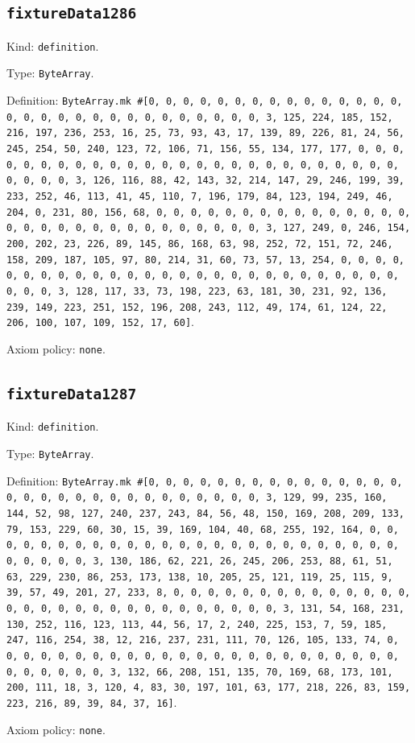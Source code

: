 \documentclass[11pt]{article}
\begin{document}
\subsection*{\texttt{fixtureData1286}}
\noindent Kind: \texttt{definition}.\par
\noindent Type: \texttt{ByteArray}.\par
\noindent Definition: \texttt{ByteArray.mk \#[0, 0, 0, 0, 0, 0, 0, 0, 0, 0, 0, 0, 0, 0, 0, 0, 0, 0, 0, 0, 0, 0, 0, 0, 0, 0, 0, 0, 0, 0, 3, 125, 224, 185, 152, 216, 197, 236, 253, 16, 25, 73, 93, 43, 17, 139, 89, 226, 81, 24, 56, 245, 254, 50, 240, 123, 72, 106, 71, 156, 55, 134, 177, 177, 0, 0, 0, 0, 0, 0, 0, 0, 0, 0, 0, 0, 0, 0, 0, 0, 0, 0, 0, 0, 0, 0, 0, 0, 0, 0, 0, 0, 0, 0, 3, 126, 116, 88, 42, 143, 32, 214, 147, 29, 246, 199, 39, 233, 252, 46, 113, 41, 45, 110, 7, 196, 179, 84, 123, 194, 249, 46, 204, 0, 231, 80, 156, 68, 0, 0, 0, 0, 0, 0, 0, 0, 0, 0, 0, 0, 0, 0, 0, 0, 0, 0, 0, 0, 0, 0, 0, 0, 0, 0, 0, 0, 0, 0, 3, 127, 249, 0, 246, 154, 200, 202, 23, 226, 89, 145, 86, 168, 63, 98, 252, 72, 151, 72, 246, 158, 209, 187, 105, 97, 80, 214, 31, 60, 73, 57, 13, 254, 0, 0, 0, 0, 0, 0, 0, 0, 0, 0, 0, 0, 0, 0, 0, 0, 0, 0, 0, 0, 0, 0, 0, 0, 0, 0, 0, 0, 0, 0, 3, 128, 117, 33, 73, 198, 223, 63, 181, 30, 231, 92, 136, 239, 149, 223, 251, 152, 196, 208, 243, 112, 49, 174, 61, 124, 22, 206, 100, 107, 109, 152, 17, 60]}.\par
\noindent Axiom policy: \texttt{none}.\par
\subsection*{\texttt{fixtureData1287}}
\noindent Kind: \texttt{definition}.\par
\noindent Type: \texttt{ByteArray}.\par
\noindent Definition: \texttt{ByteArray.mk \#[0, 0, 0, 0, 0, 0, 0, 0, 0, 0, 0, 0, 0, 0, 0, 0, 0, 0, 0, 0, 0, 0, 0, 0, 0, 0, 0, 0, 0, 0, 3, 129, 99, 235, 160, 144, 52, 98, 127, 240, 237, 243, 84, 56, 48, 150, 169, 208, 209, 133, 79, 153, 229, 60, 30, 15, 39, 169, 104, 40, 68, 255, 192, 164, 0, 0, 0, 0, 0, 0, 0, 0, 0, 0, 0, 0, 0, 0, 0, 0, 0, 0, 0, 0, 0, 0, 0, 0, 0, 0, 0, 0, 0, 0, 3, 130, 186, 62, 221, 26, 245, 206, 253, 88, 61, 51, 63, 229, 230, 86, 253, 173, 138, 10, 205, 25, 121, 119, 25, 115, 9, 39, 57, 49, 201, 27, 233, 8, 0, 0, 0, 0, 0, 0, 0, 0, 0, 0, 0, 0, 0, 0, 0, 0, 0, 0, 0, 0, 0, 0, 0, 0, 0, 0, 0, 0, 0, 0, 3, 131, 54, 168, 231, 130, 252, 116, 123, 113, 44, 56, 17, 2, 240, 225, 153, 7, 59, 185, 247, 116, 254, 38, 12, 216, 237, 231, 111, 70, 126, 105, 133, 74, 0, 0, 0, 0, 0, 0, 0, 0, 0, 0, 0, 0, 0, 0, 0, 0, 0, 0, 0, 0, 0, 0, 0, 0, 0, 0, 0, 0, 0, 0, 3, 132, 66, 208, 151, 135, 70, 169, 68, 173, 101, 200, 111, 18, 3, 120, 4, 83, 30, 197, 101, 63, 177, 218, 226, 83, 159, 223, 216, 89, 39, 84, 37, 16]}.\par
\noindent Axiom policy: \texttt{none}.\par
\end{document}
